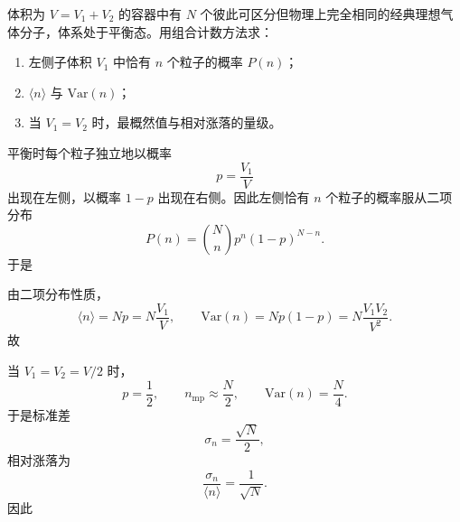 \begin{question}[16分]
体积为 $V=V_1+V_2$ 的容器中有 $N$ 个彼此可区分但物理上完全相同的经典理想气体分子，体系处于平衡态。用组合计数方法求：
\begin{enumerate}[label=(\arabic*),leftmargin=2.8em,itemsep=0.2em]
\item 左侧子体积 $V_1$ 中恰有 $n$ 个粒子的概率 $P(n)$；
\item $\langle n\rangle$ 与 $\mathrm{Var}(n)$；
\item 当 $V_1=V_2$ 时，最概然值与相对涨落的量级。
\end{enumerate}
\begin{solution}

平衡时每个粒子独立地以概率
\[
p=\frac{V_1}{V}
\]
出现在左侧，以概率 $1-p$ 出现在右侧。因此左侧恰有 $n$ 个粒子的概率服从二项分布
\[
P(n)=\binom{N}{n}p^n(1-p)^{N-n}.
\]
于是

由二项分布性质，
\[
\langle n\rangle=Np=N\frac{V_1}{V},
\qquad
\mathrm{Var}(n)=Np(1-p)=N\frac{V_1V_2}{V^2}.
\]
故

当 $V_1=V_2=V/2$ 时，
\[
p=\frac12,
\qquad
n_{\mathrm{mp}}\approx \frac{N}{2},
\qquad
\mathrm{Var}(n)=\frac{N}{4}.
\]
于是标准差
\[
\sigma_n=\frac{\sqrt N}{2},
\]
相对涨落为
\[
\frac{\sigma_n}{\langle n\rangle}=\frac{1}{\sqrt N}.
\]
因此
\end{solution}
\end{question}

